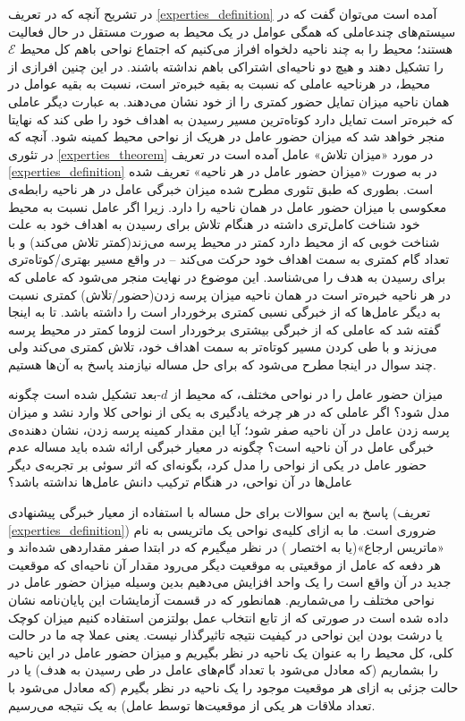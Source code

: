 در تشریح آنچه که در تعریف
\ref{experties_definition}
آمده است می‌توان گفت که در سیستم‌های چندعاملی که همگی عوامل در یک محیط به صورت مستقل در حال فعالیت هستند؛ محیط را به چند ناحیه دلخواه افراز می‌کنیم که اجتماع نواحی باهم کل محیط $\mathcal{E}$ را تشکیل دهند و هیچ دو ناحیه‌ای اشتراکی باهم نداشته باشند. در این چنین افرازی از محیط، در هرناحیه عاملی که نسبت به بقیه خبره‌تر است، نسبت به بقیه عوامل در همان ناحیه میزان تمایل حضور کمتری را از خود نشان می‌دهند. به عبارت دیگر عاملی که خبره‌تر است تمایل دارد کوتاه‌ترین مسیر رسیدن به اهداف خود را طی کند که نهایتا منجر خواهد شد که میزان حضور عامل در هریک از نواحی محیط کمینه شود.
آنچه که در تئوری
\ref{experties_theorem}
در مورد «میزان تلاش» عامل آمده است در تعریف
\ref{experties_definition}
در به صورت «میزان حضور عامل در هر ناحیه» تعریف شده است. بطوری که طبق تئوری مطرح شده میزان خبرگی عامل در هر ناحیه رابطه‌ی معکوسی با میزان حضور عامل در همان ناحیه را دارد. زیرا اگر عامل نسبت به محیط خود شناخت کامل‌تری داشته در هنگام تلاش برای رسیدن به اهداف خود به علت شناخت خوبی که از محیط دارد کمتر در محیط پرسه می‌زند(کمتر تلاش می‌کند) و با تعداد گام کمتری به سمت اهداف خود حرکت می‌کند -- در واقع مسیر بهتری/کوتاه‌تری برای رسیدن به هدف را می‌شناسد. این موضوع در نهایت منجر می‌شود که عاملی که در هر ناحیه خبره‌تر است در همان ناحیه میزان پرسه زدن(حضور/تلاش) کمتری نسبت به دیگر عامل‌ها که از خبرگی نسبی کمتری برخوردار است را داشته باشد.
تا به اینجا گفته شد که عاملی که از خبرگی بیشتری برخوردار است لزوما کمتر در محیط پرسه می‌زند و با طی کردن مسیر کوتاه‌تر به سمت اهداف خود، تلاش کمتری می‌کند ولی چند سوال در اینجا مطرح می‌شود که برای حل مساله نیازمند پاسخ به آن‌ها هستیم.
\begin{enumerate}
 میزان حضور عامل را در نواحی مختلف، که محیط از $d$-بعد تشکیل شده است چگونه مدل شود؟
 اگر عاملی که در هر چرخه یادگیری به یکی از نواحی کلا وارد نشد و میزان پرسه زدن عامل در آن ناحیه صفر شود؛ آیا این مقدار کمینه پرسه زدن، نشان دهنده‌ی خبرگی عامل در آن ناحیه است؟
 چگونه در معیار خبرگی ارائه شده باید مساله عدم حضور عامل در یکی از نواحی را مدل کرد، بگونه‌ای که اثر سوئی بر تجربه‌ی دیگر عامل‌ها در آن نواحی، در هنگام ترکیب دانش عامل‌ها نداشته باشد؟
\end{enumerate}
پاسخ به این سوالات برای حل مساله با استفاده از معیار خبرگی پیشنهادی (تعریف \ref{experties_definition}) ضروری است. ما به ازای کلیه‌ی نواحی یک ماتریسی به نام «ماتریس ارجاع»(یا به اختصار ) در نظر میگیرم که در ابتدا صفر مقداردهی شده‌اند و هر دفعه که عامل از موقعیتی‌ به موقعیت دیگر می‌رود مقدار آن ناحیه‌ای که موقعیت جدید در آن واقع است را یک واحد افزایش می‌دهیم بدین وسیله میزان حضور عامل در نواحی مختلف را می‌شماریم. همانطور که در قسمت آزمایشات این پایان‌نامه نشان داده شده است در صورتی که از تابع انتخاب عمل بولتزمن استفاده کنیم میزان کوچک یا درشت بودن این نواحی در کیفیت نتیجه تاثیرگذار نیست. یعنی عملا چه ما در حالت کلی، کل محیط را به عنوان یک ناحیه در نظر بگیریم و میزان حضور عامل در این ناحیه را بشماریم (که معادل می‌شود با تعداد گام‌های عامل در طی رسیدن به هدف) یا در حالت جزئی به ازای هر موقعیت موجود را یک ناحیه در نظر بگیرم (که معادل می‌شود با تعداد ملاقات هر یکی از موقعیت‌ها توسط عامل) به یک نتیجه می‌رسیم.
